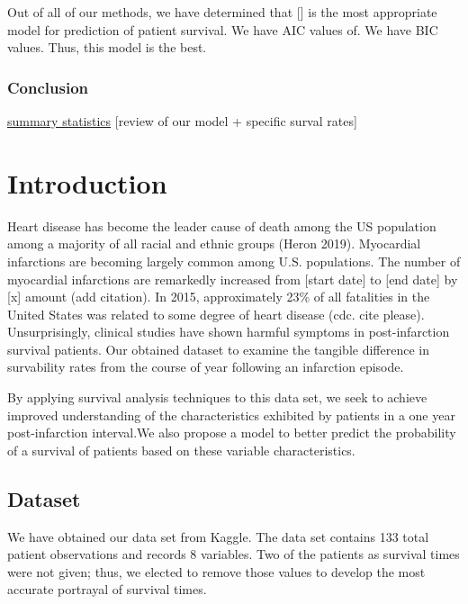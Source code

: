 \documentclass[
]{article}
\begin{document}
Out of all of our methods, we have determined that {[}{]} is the most
appropriate model for prediction of patient survival. We have AIC values
of. We have BIC values. Thus, this model is the best.

\hypertarget{conclusion}{%
\subsubsection{Conclusion}\label{conclusion}}

\protect\hyperlink{summary-statistics}{summary statistics} {[}review of
our model + specific surval rates{]}

\hypertarget{introduction}{%
\section{Introduction}\label{introduction}}

Heart disease has become the leader cause of death among the US
population among a majority of all racial and ethnic groups (Heron
2019). Myocardial infarctions are becoming largely common among U.S.
populations. The number of myocardial infarctions are remarkedly
increased from {[}start date{]} to {[}end date{]} by {[}x{]} amount (add
citation). In 2015, approximately 23\% of all fatalities in the United
States was related to some degree of heart disease (cdc. cite please).
Unsurprisingly, clinical studies have shown harmful symptoms in
post-infarction survival patients. Our obtained dataset to examine the
tangible difference in survability rates from the course of year
following an infarction episode.

By applying survival analysis techniques to this data set, we seek to
achieve improved understanding of the characteristics exhibited by
patients in a one year post-infarction interval.We also propose a model
to better predict the probability of a survival of patients based on
these variable characteristics.

\hypertarget{dataset}{%
\subsection{Dataset}\label{dataset}}

We have obtained our data set from Kaggle. The data set contains 133
total patient observations and records 8 variables. Two of the patients
as survival times were not given; thus, we elected to remove those
values to develop the most accurate portrayal of survival times.
\end{document}
